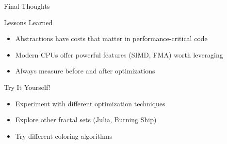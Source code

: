 \documentclass{beamer}
\begin{document}
\begin{frame}{Final Thoughts}
    \begin{block}{Lessons Learned}
        \begin{itemize}
            \item Abstractions have costs that matter in performance-critical code
            \item Modern CPUs offer powerful features (SIMD, FMA) worth leveraging
            \item Always measure before and after optimizations
        \end{itemize}
    \end{block}
    \begin{exampleblock}{Try It Yourself!}
        \begin{itemize}
            \item Experiment with different optimization techniques
            \item Explore other fractal sets (Julia, Burning Ship)
            \item Try different coloring algorithms
        \end{itemize}
    \end{exampleblock}
\end{frame}
\end{document}
